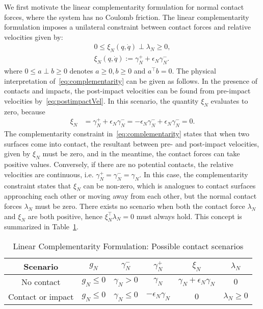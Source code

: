 We first motivate the linear complementarity formulation for normal contact
forces, where the system has no Coulomb friction.
% 
The linear complementarity formulation imposes a unilateral constraint between
contact forces and relative velocities given by:
\begin{equation}
  \begin{gathered}
    0 \leq 
      \xi_N(q, \dot{q}) 
      \perp
      \lambda_N  
      \geq 0, \\
      \xi_N(q, \dot{q}) := \gamma_N^+ + \epsilon_N \gamma_N^-.
  \end{gathered}
  \label{eq:complementarity} 
\end{equation}
\noindent where $0 \leq a \perp b \geq 0$ denotes $a \geq 0, b \geq 0$ and
$a^\top b=0$.
% 
The physical interpretation of~\eqref{eq:complementarity} can be given as
follows.
%
%
In the presence of contacts and impacts, the post-impact velocities can be found
from pre-impact velocities by~\eqref{eq:postimpactVel}.
%
In this scenario, the quantity $\xi_N$ evaluates to zero, because
\begin{align*}
  \xi_N &= \gamma_N^+ + \epsilon_N \gamma_N^- = -\epsilon_N \gamma_N^- + \epsilon_N \gamma_N^- = 0.
\end{align*}
%
The complementarity constraint in~\eqref{eq:complementarity} states that when
two surfaces come into contact, the resultant between pre- and post-impact
velocities, given by $\xi_N$ must be zero, and in the meantime, the contact
forces can take positive values.
%
Conversely, if there are no potential contacts, the relative velocities are
continuous, i.e. $\gamma_N^+ = \gamma_N^- = \gamma_N$.
%
In this case, the complementarity constraint states that $\xi_N$ can be
non-zero, which is analogues to contact surfaces approaching each other or
moving away from each other, but the normal contact forces $\lambda_N$ must be
zero. 
%
There exists no scenario when both the contact force $\lambda_N$ and $\xi_N$ are
both positive, hence $\xi_N^\top \lambda_N = 0$ must always hold.
%
This concept is summarized in Table~\ref{tab:complementarity}.
%
%
\begin{table}[b]
  \centering
  \caption{Linear Complementarity Formulation: Possible contact scenarios}
  \begin{tabular}{|c|c|c|c|c|c|}
    \hline
    Scenario & $g_N$ & $\gamma_N^-$ & $\gamma_N^+$ & $\xi_N$ & $\lambda_N$ \\
    \hline\hline
    No contact & $g_N \leq 0$  & $\gamma_N > 0$ & $\gamma_N$ & $ \gamma_N +\epsilon_N\gamma_N$ & $0$ \\
    Contact or impact & $g_N \leq 0$ &  $\gamma_N \leq 0$ & $- \epsilon_N \gamma_N$ & $0$ & $\lambda_N \geq 0$ \\
    \hline
  \end{tabular}
  \label{tab:complementarity}
\end{table}
%

